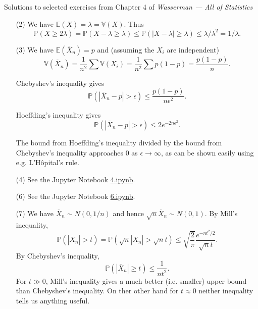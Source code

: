\documentclass[10pt]{article}
\renewcommand{\P}{\mathbb{P}}
\newcommand{\V}{\mathbb{V}}
\newcommand{\E}{\mathbb{E}}
\begin{document}
\noindent \large{Solutions to selected exercises from Chapter 4 of
\emph{Wasserman --- All of Statistics}}

\begin{enumerate}
\item[(2)]
We have $\E(X)=\lambda=\V(X)$. Thus
\[
\P(X\geq 2\lambda) =\P(X-\lambda\geq \lambda)\leq \P(|X-\lambda|\geq \lambda)
\leq \lambda / \lambda^2=1/\lambda.
\]

\item[(3)]
We have $\E(\overline X_n)=p$ and (assuming the $X_i$ are independent)
\[
\V(\overline X_n) = \frac{1}{n^2} \sum \V(X_i) = \frac{1}{n^2} \sum p(1-p) =
\frac{p(1-p)}{n}.
\]

Chebyshev's inequality gives
\[
\P(|\overline X_n - p| > \epsilon) \leq \frac{p(1-p)}{n\epsilon^2}.
\]

Hoeffding's inequality gives
\[
\P(|\overline X_n - p| > \epsilon) \leq 2e^{-2n\epsilon^2}.
\]

The bound from Hoeffding's inequality divided by the bound from Chebyshev's
inequality approaches 0 as $\epsilon\to \infty$, as can be shown easily using
e.g. L'H\^opital's rule.

\item[(4)]
See the Jupyter Notebook
\href{https://github.com/ajrasmus/some_of_statistics/blob/main/chapter_4/4.ipynb}{4.ipynb}.

\item[(6)]
See the Jupyter Notebook
\href{https://github.com/ajrasmus/some_of_statistics/blob/main/chapter_4/6.ipynb}{6.ipynb}.

\item[(7)]
We have $\overline X_n \sim N(0,1/n)$ and hence
$\sqrt n \overline X_n \sim N(0,1)$. By Mill's inequality,
\[
\P(|\overline X_n| > t) = \P(\sqrt n |\overline X_n| > \sqrt n t)
\leq \sqrt{\frac{2}{\pi}} \frac{e^{-nt^2/2}}{\sqrt n t}.
\]
By Chebyshev's inequality,
\[
\P(|\overline X_n| \geq t) \leq \frac{1}{nt^2}.
\]
For $t\gg 0$, Mill's inequality gives a much better (i.e. smaller) upper bound
than Chebyshev's inequality. On ther other hand for $t\approx 0$ neither
inequality tells us anything useful.

\end{enumerate}
\end{document}
